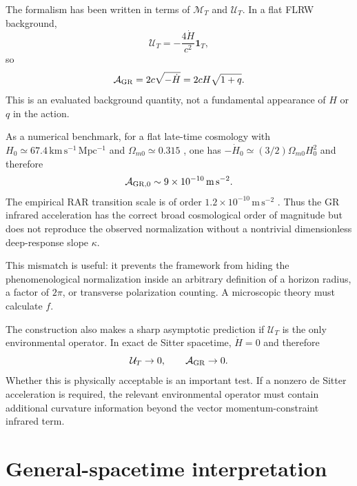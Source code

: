 \documentclass[11pt]{article}
\newcommand{\MT}{\mathcal{M}_{T}}
\newcommand{\UT}{\mathcal{U}_{T}}
\begin{document}
The formalism has been written in terms of $\MT$ and $\UT$. In a flat FLRW background,
\begin{equation}
    \UT=-\frac{4\dot H}{c^2}\mathbf{1}_T,
\end{equation}
so
\begin{equation}
    \mathcal A_{\rm GR}=2c\sqrt{-\dot H}
    =2cH\sqrt{1+q}.
    \label{eq:Aq}
\end{equation}
This is an evaluated background quantity, not a fundamental appearance of $H$ or $q$ in the action.

As a numerical benchmark, for a flat late-time cosmology with $H_0\simeq67.4\,\mathrm{km\,s^{-1}\,Mpc^{-1}}$ and $\Omega_{m0}\simeq0.315$ \cite{Planck2018}, one has $-\dot H_0\simeq(3/2)\Omega_{m0}H_0^2$ and therefore
\begin{equation}
    \mathcal A_{\rm GR,0}\sim9\times10^{-10}\,\mathrm{m\,s^{-2}}.
\end{equation}
The empirical RAR transition scale is of order $1.2\times10^{-10}\,\mathrm{m\,s^{-2}}$ \cite{McGaugh2016RAR}. Thus the GR infrared acceleration has the correct broad cosmological order of magnitude but does not reproduce the observed normalization without a nontrivial dimensionless deep-response slope $\kappa$.

This mismatch is useful: it prevents the framework from hiding the phenomenological normalization inside an arbitrary definition of a horizon radius, a factor of $2\pi$, or transverse polarization counting. A microscopic theory must calculate $f$.

The construction also makes a sharp asymptotic prediction if $\UT$ is the only environmental operator. In exact de Sitter spacetime, $\dot H=0$ and therefore
\begin{equation}
    \UT\to0,
    \qquad
    \mathcal A_{\rm GR}\to0.
\end{equation}
Whether this is physically acceptable is an important test. If a nonzero de Sitter acceleration is required, the relevant environmental operator must contain additional curvature information beyond the vector momentum-constraint infrared term.

\section{General-spacetime interpretation}
\end{document}

